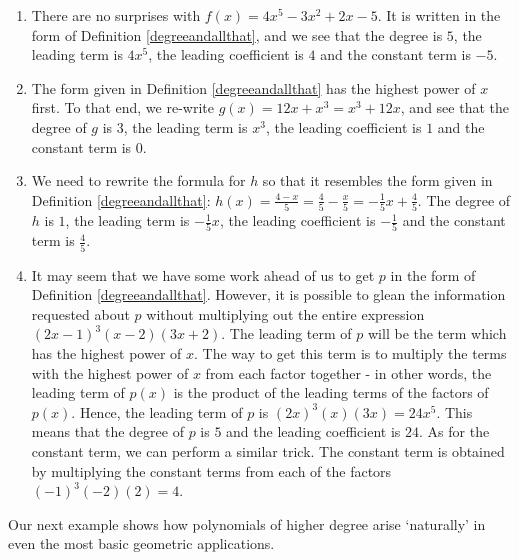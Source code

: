 {
\begin{enumerate}

\item  There are no surprises with $f(x) = 4x^5 - 3x^2 + 2x - 5$.  It is written in the form of Definition \ref{degreeandallthat}, and we see that the degree is $5$, the leading term is $4x^5$, the leading coefficient is $4$ and the constant term is $-5$.

\item The form given in Definition \ref{degreeandallthat} has the highest power of $x$ first.  To that end, we re-write $g(x) = 12x +x^3 = x^3+12x$, and see that the degree of $g$ is $3$, the leading term is $x^3$, the leading coefficient is $1$ and the constant term is $0$.

\item  We need to rewrite the formula for $h$ so that it resembles the form given in Definition \ref{degreeandallthat}:  $h(x) = \frac{4-x}{5} = \frac{4}{5} - \frac{x}{5} = -\frac{1}{5} x + \frac{4}{5}$.  The degree of $h$ is $1$, the leading term is $-\frac{1}{5} x$, the leading coefficient is $-\frac{1}{5}$ and the constant term is $\frac{4}{5}$.

\item  It may seem that we have some work ahead of us to get $p$ in the form of Definition \ref{degreeandallthat}.  However, it is possible to glean the information requested about $p$ without multiplying out the entire expression $(2x-1)^{3}(x-2)(3x+2)$.  The leading term of $p$ will be the term which has the highest power of $x$.  The way to get this term  is to multiply the terms with the highest power of $x$ from each factor together - in other words, the leading term of $p(x)$ is the product of the leading terms of the factors of $p(x)$.  Hence, the leading term of $p$ is $(2x)^3(x)(3x) =  24x^5$.  This means that the degree of $p$ is $5$ and the leading coefficient is $24$.  As for the constant term, we can perform a similar trick.  The constant term is obtained by multiplying the constant terms from each of the factors $(-1)^3(-2)(2) = 4$.  

\end{enumerate}
}

\medskip

Our next example shows how polynomials of higher degree arise `naturally' in even the most basic geometric applications.

\medskip

